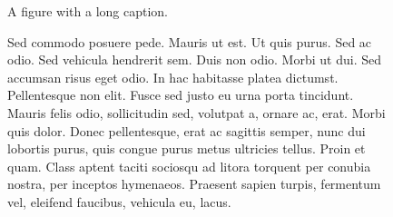 \begin{figure}
\centering
A figure with a long caption.
\par
\caption{Sed commodo posuere pede. Mauris ut est. Ut quis purus. Sed ac odio.
Sed vehicula hendrerit sem. Duis non odio. Morbi ut dui. Sed accumsan risus eget odio.
In hac habitasse platea dictumst. Pellentesque non elit. Fusce sed justo eu urna porta tincidunt.
Mauris felis odio, sollicitudin sed, volutpat a, ornare ac, erat.
Morbi quis dolor.
Donec pellentesque, erat ac sagittis semper, nunc dui lobortis purus, quis congue purus metus ultricies tellus.
Proin et quam.
Class aptent taciti sociosqu ad litora torquent per conubia nostra, per inceptos hymenaeos.
Praesent sapien turpis, fermentum vel, eleifend faucibus, vehicula eu, lacus.%
}
\end{figure}
